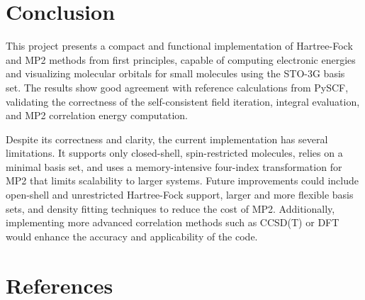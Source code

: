 \documentclass[12pt]{article}
\begin{document}
\section{Conclusion}

This project presents a compact and functional implementation of Hartree-Fock and MP2 methods from first principles, capable of computing electronic energies and visualizing molecular orbitals for small molecules using the STO-3G basis set. The results show good agreement with reference calculations from PySCF, validating the correctness of the self-consistent field iteration, integral evaluation, and MP2 correlation energy computation.

Despite its correctness and clarity, the current implementation has several limitations. It supports only closed-shell, spin-restricted molecules, relies on a minimal basis set, and uses a memory-intensive four-index transformation for MP2 that limits scalability to larger systems. Future improvements could include open-shell and unrestricted Hartree-Fock support, larger and more flexible basis sets, and density fitting techniques to reduce the cost of MP2. Additionally, implementing more advanced correlation methods such as CCSD(T) or DFT would enhance the accuracy and applicability of the code. 

\section*{References}
\end{document}
